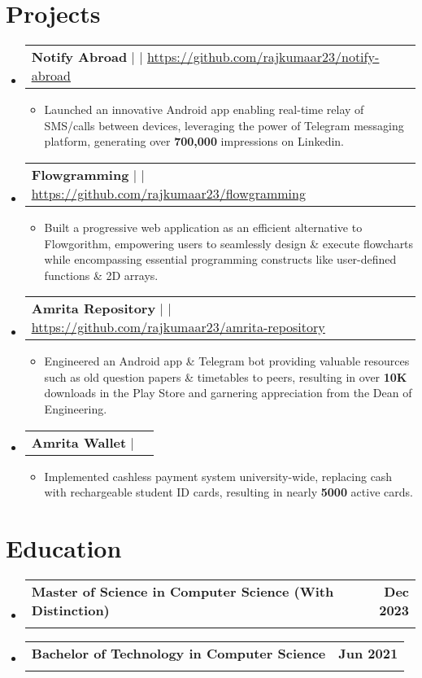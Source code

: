 \documentclass[letterpaper,11pt]{article}
\makeatletter
\newcommand{\resumeItem}[1]{
  \item\small{
    {#1 \vspace{-2pt}}
  }
}
\newcommand{\resumeSubheading}[4]{
  \vspace{-2pt}\item
    \begin{tabular*}{1.0\textwidth}[t]{l@{\extracolsep{\fill}}r}
      \textbf{#1} & \textbf{\small #2} \\
      \text{\small#3} & \text{\small #4} \\
    \end{tabular*}\vspace{-7pt}
}
\newcommand{\resumeProjectHeading}[2]{
    \item
    \begin{tabular*}{1.001\textwidth}{l@{\extracolsep{\fill}}r}
      \small#1 & \textbf{\small #2}\\
    \end{tabular*}\vspace{-7pt}
}
\newcommand{\resumeSubHeadingListStart}{\begin{itemize}[leftmargin=0.0in, label={}]}
\newcommand{\resumeSubHeadingListEnd}{\end{itemize}}
\newcommand{\resumeItemListStart}{\begin{itemize}}
\newcommand{\resumeItemListEnd}{\end{itemize}\vspace{-5pt}}
\makeatother
\begin{document}
\section{Projects}
    \vspace{-5pt}
    \resumeSubHeadingListStart
        \resumeProjectHeading
          {\textbf{Notify Abroad} $|$ \text{Android, Java} $|$ \href{https://github.com/rajkumaar23/notify-abroad}{\underline{https://github.com/rajkumaar23/notify-abroad}}}{}
          \resumeItemListStart
            \resumeItem{Launched an innovative Android app enabling real-time relay of SMS/calls between devices, leveraging the power of Telegram messaging platform, generating over \textbf{700,000} impressions on Linkedin.}
          \resumeItemListEnd 
         \vspace{-17pt}
    \resumeProjectHeading
          {\textbf{Flowgramming} $|$ \text{HTML, Bootstrap, jQuery,  JointJS} $|$ \href{https://github.com/rajkumaar23/flowgramming/}{\underline{https://github.com/rajkumaar23/flowgramming}}}{}
          \resumeItemListStart
            \resumeItem{Built a progressive web application as an efficient alternative to Flowgorithm, empowering users to seamlessly design \& execute flowcharts while encompassing essential programming constructs like user-defined functions \& 2D arrays.}
          \resumeItemListEnd 
          \vspace{-17pt}
      \resumeProjectHeading
          {\textbf{Amrita Repository} $|$ \text{Android, SQLite, Web Scraping, PHP, Python} $|$ \href{https://github.com/rajkumaar23/amrita-repository}{\underline{https://github.com/rajkumaar23/amrita-repository}}}{}
          \resumeItemListStart
            \resumeItem{Engineered an Android app  \& Telegram bot providing valuable resources such as old question papers \& timetables to peers, resulting in over \textbf{10K} downloads in the Play Store and garnering appreciation from the Dean of Engineering.}
          \resumeItemListEnd
          \vspace{-17pt}
      \resumeProjectHeading
          {\textbf{Amrita Wallet} $|$ \text{Android, NodeJS, MongoDB, VueJS}}{}
          \resumeItemListStart
            \resumeItem{Implemented cashless payment system university-wide, replacing cash with rechargeable student ID cards, resulting in nearly \textbf{5000} active cards.}
          \resumeItemListEnd 
    \resumeSubHeadingListEnd
\vspace{-10pt}

\section{Education}
  \resumeSubHeadingListStart
      \resumeSubheading  {Master of Science in Computer Science (With Distinction)}{Dec 2023} {Arizona State University $|$ {Tempe, AZ, USA}} {GPA : 4.0/4.0}
    \resumeSubheading  {Bachelor of Technology in Computer Science}{Jun 2021} {Amrita Vishwa Vidyapeetham $|$ {Coimbatore, Tamil Nadu, India}} {GPA : 8.57/10.0}
  \resumeSubHeadingListEnd
  \vspace{-8pt}
\end{document}
